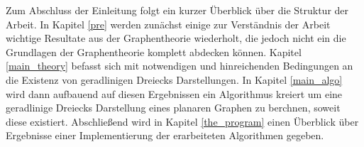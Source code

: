 Zum Abschluss der Einleitung folgt ein kurzer Überblick über die Struktur der Arbeit. In Kapitel \ref{pre} werden zunächst einige zur Verständnis der Arbeit wichtige Resultate aus der Graphentheorie wiederholt, die jedoch nicht ein die Grundlagen der Graphentheorie komplett abdecken können. Kapitel \ref{main_theory} befasst sich mit notwendigen und hinreichenden Bedingungen an die Existenz von geradlinigen Dreiecks Darstellungen. In Kapitel \ref{main_algo} wird dann aufbauend auf diesen Ergebnissen ein Algorithmus kreiert um eine geradlinige Dreiecks Darstellung eines planaren Graphen zu berchnen, soweit diese existiert. Abschließend wird in Kapitel \ref{the_program} einen Überblick über Ergebnisse einer Implementierung der erarbeiteten Algorithmen gegeben.